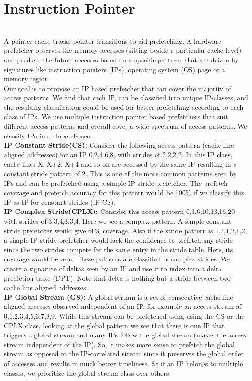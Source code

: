 \documentclass{article}
\begin{document}
\section{Instruction Pointer}
\\A pointer cache tracks pointer transitions to aid prefetching. A hardware prefetcher observes the memory accesses (sitting beside a particular cache level) and predicts the future accesses based on a specific patterns that are driven by signatures like instruction pointers (IPs), operating system (OS) page or a memory region.
\\Our goal is to propose an IP based prefetcher that can cover the majority of access patterns. We find that each IP, can be classified into unique IP-classes, and the resulting classification could be used for better prefetching according to each class of IPs. We use multiple instruction pointer based prefetchers that suit different access patterns and overall cover a wide spectrum of access patterns. We classify IPs into three classes:
\\\textbf{IP Constant Stride(CS): }Consider the following access pattern (cache line aligned addresses) for an IP 0,2,4,6,8, with strides of 2,2,2,2. In this IP class, cache lines X, X+2, X+4 and so on are accessed by the same IP resulting in a constant stride pattern of 2. This is one of the more common patterns seen by IPs and can be prefetched using a simple IP-stride prefetcher. The prefetch coverage and prefetch accuracy for this pattern would be 100\% if we classify this IP as IP for constant strides (IP-CS).
\\\textbf{IP Complex Stride(CPLX): }Consider this access pattern 0,3,6,10,13,16,20 with strides of 3,3,4,3,3,4. Here we see a complex pattern. A simple constant stride prefetcher would give 66\% coverage. Also if the stride pattern is 1,2,1,2,1,2, a simple IP-stride prefetcher would lack the confidence to prefetch any stride since the two strides compete for the same entry in the stride table. Here, its coverage would be zero. These patterns are classified as complex strides. We create a signature of deltas seen by an IP and use it to index into a delta prediction table (DPT). Note that delta is nothing but a stride between two cache line aligned addresses.
\\\textbf{IP Global Stream (GS): }A global stream is a set of consecutive cache line aligned accesses observed independent of an IP, for example an access stream of 0,1,2,3,4,5,6,7,8,9. While this stream can be prefetched using using the CS or the CPLX class, looking at the global pattern we see that there is one IP that triggers a global stream and many IPs follow the global stream (makes the access stream independent of the IP). So, it makes more sense to prefetch the global stream as opposed to the IP-correlated stream since it preserves the global order of accesses and results in much better timeliness. So if an IP belongs to multiple classes, we prioritize the global stream class over others.
\end{document}
